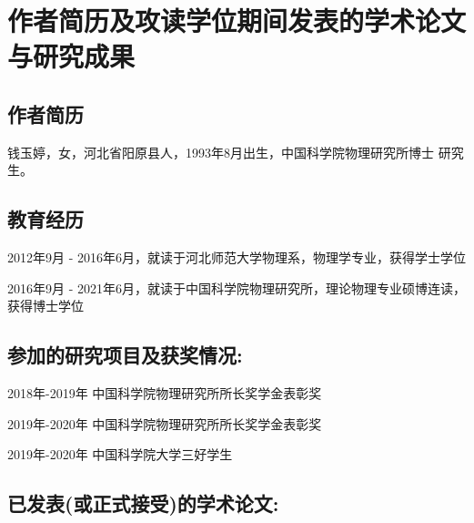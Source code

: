 \chapter{作者简历及攻读学位期间发表的学术论文与研究成果}


\section*{作者简历}

钱玉婷，女，河北省阳原县人，1993年8月出生，中国科学院物理研究所博士
研究生。
\section*{教育经历}
2012年9月 - 2016年6月，就读于河北师范大学物理系，物理学专业，获得学士学位

2016年9月 - 2021年6月，就读于中国科学院物理研究所，理论物理专业硕博连读，获得博士学位

\section*{参加的研究项目及获奖情况:}

2018年-2019年 中国科学院物理研究所所长奖学金表彰奖 

2019年-2020年 中国科学院物理研究所所长奖学金表彰奖 

2019年-2020年 中国科学院大学三好学生 

\clearpage
\section*{已发表(或正式接受)的学术论文:}

